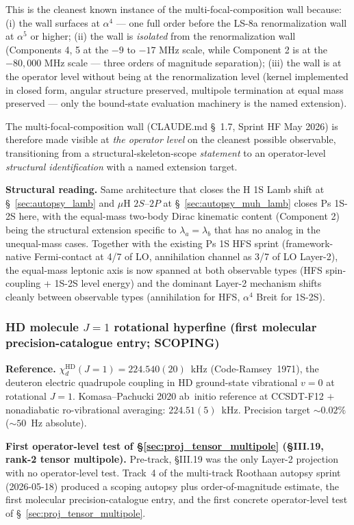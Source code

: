 \documentclass[11pt]{article}
\begin{document}
This is the cleanest known instance of the multi-focal-composition wall
because: (i) the wall surfaces at $\alpha^4$ --- one full order before
the LS-8a renormalization wall at $\alpha^5$ or higher; (ii) the wall
is \emph{isolated} from the renormalization wall (Components 4, 5 at
the $-9$ to $-17$ MHz scale, while Component 2 is at the $-80{,}000$ MHz
scale --- three orders of magnitude separation); (iii) the wall is at
the operator level without being at the renormalization level (kernel
implemented in closed form, angular structure preserved, multipole
termination at equal mass preserved --- only the bound-state evaluation
machinery is the named extension).

The multi-focal-composition wall (CLAUDE.md \S~1.7, Sprint HF May 2026)
is therefore made visible at \emph{the operator level} on the cleanest
possible observable, transitioning from a structural-skeleton-scope
\emph{statement} to an operator-level \emph{structural identification}
with a named extension target.

\textbf{Structural reading.}  Same architecture that closes the
H 1S Lamb shift at \S~\ref{sec:autopsy_lamb} and $\mu$H $2S$--$2P$ at
\S~\ref{sec:autopsy_muh_lamb} closes Ps 1S-2S here, with the equal-mass
two-body Dirac kinematic content (Component 2) being the structural
extension specific to $\lambda_a = \lambda_b$ that has no analog in
the unequal-mass cases.  Together with the existing Ps 1S HFS sprint
(framework-native Fermi-contact at 4/7 of LO, annihilation channel as
3/7 of LO Layer-2), the equal-mass leptonic axis is now spanned at
both observable types (HFS spin-coupling + 1S-2S level energy) and the
dominant Layer-2 mechanism shifts cleanly between observable types
(annihilation for HFS, $\alpha^4$ Breit for 1S-2S).

\subsubsection{HD molecule $J=1$ rotational hyperfine (first molecular precision-catalogue entry; SCOPING)}
\label{sec:autopsy_HD_rotational_HFS}

\textbf{Reference.}  $\chi_d^\text{HD}(J=1) = 224.540(20)$~kHz
(Code-Ramsey~1971), the deuteron electric quadrupole coupling in
HD ground-state vibrational $v=0$ at rotational $J=1$.  Komasa--Pachucki
2020 ab~initio reference at CCSDT-F12 $+$ nonadiabatic ro-vibrational
averaging: $224.51(5)$~kHz.  Precision target $\sim 0.02\%$
($\sim 50$~Hz absolute).

\textbf{First operator-level test of \S\ref{sec:proj_tensor_multipole}
(\S III.19, rank-2 tensor multipole).}  Pre-track, \S III.19 was
the only Layer-2 projection with no operator-level test.  Track~4
of the multi-track Roothaan autopsy sprint (2026-05-18) produced
a scoping autopsy plus order-of-magnitude estimate, the first
molecular precision-catalogue entry, and the first concrete
operator-level test of \S~\ref{sec:proj_tensor_multipole}.
\end{document}
